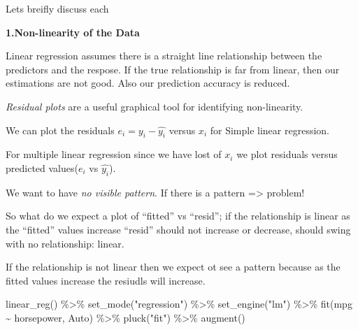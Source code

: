 \documentclass[
  letterpaper,
  DIV=11,
  numbers=noendperiod]{scrreprt}
\newenvironment{Shaded}{\begin{snugshade}}{\end{snugshade}}
\newcommand{\FunctionTok}[1]{\textcolor[rgb]{0.02,0.16,0.49}{#1}}
\newcommand{\NormalTok}[1]{\textcolor[rgb]{0.33,0.33,0.33}{#1}}
\newcommand{\SpecialCharTok}[1]{\textcolor[rgb]{0.00,0.46,0.62}{#1}}
\newcommand{\StringTok}[1]{\textcolor[rgb]{0.00,0.50,0.00}{#1}}
\begin{document}
Lets breifly discuss each

\textbf{1.Non-linearity of the Data}

Linear regression assumes there is a straight line relationship between
the predictors and the respose. If the true relationship is far from
linear, then our estimations are not good. Also our prediction accuracy
is reduced.

\emph{Residual plots} are a useful graphical tool for identifying
non-linearity.

We can plot the residuals \(e_i = y_i - \hat{y_i}\) versus \(x_i\) for
Simple linear regression.

For multiple linear regression since we have lost of \(x_i\) we plot
residuals versus predicted values(\(e_i\) vs \(\hat{y_i}\)).

We want to have \emph{no visible pattern}. If there is a pattern
=\textgreater{} problem!

So what do we expect a plot of ``fitted'' vs ``resid''; if the
relationship is linear as the ``fitted'' values increase ``resid''
should not increase or decrease, should swing with no relationship:
linear.

If the relationship is not linear then we expect ot see a pattern
because as the fitted values increase the resiudls will increase.

\begin{Shaded}
\begin{Highlighting}[]
\FunctionTok{linear\_reg}\NormalTok{() }\SpecialCharTok{\%\textgreater{}\%} 
  \FunctionTok{set\_mode}\NormalTok{(}\StringTok{"regression"}\NormalTok{) }\SpecialCharTok{\%\textgreater{}\%} 
  \FunctionTok{set\_engine}\NormalTok{(}\StringTok{"lm"}\NormalTok{) }\SpecialCharTok{\%\textgreater{}\%} 
  \FunctionTok{fit}\NormalTok{(mpg }\SpecialCharTok{\textasciitilde{}}\NormalTok{ horsepower, Auto) }\SpecialCharTok{\%\textgreater{}\%} 
  \FunctionTok{pluck}\NormalTok{(}\StringTok{"fit"}\NormalTok{) }\SpecialCharTok{\%\textgreater{}\%} 
  \FunctionTok{augment}\NormalTok{() }
\end{Highlighting}
\end{Shaded}
\end{document}
